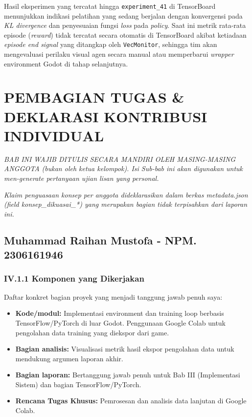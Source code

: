\documentclass[12pt,a4paper]{article}
\begin{document}
Hasil eksperimen yang tercatat hingga \texttt{experiment\_41} di TensorBoard menunjukkan indikasi pelatihan yang sedang berjalan dengan konvergensi pada \textit{KL divergence} dan penyesuaian fungsi \textit{loss} pada \textit{policy}. Saat ini metrik rata-rata episode (\textit{reward}) tidak tercatat secara otomatis di TensorBoard akibat ketiadaan \textit{episode end signal} yang ditangkap oleh \texttt{VecMonitor}, sehingga tim akan mengevaluasi perilaku visual agen secara manual atau memperbarui \textit{wrapper} environment Godot di tahap selanjutnya.

\newpage

\section{PEMBAGIAN TUGAS \& DEKLARASI KONTRIBUSI INDIVIDUAL}

\textit{BAB INI WAJIB DITULIS SECARA MANDIRI OLEH MASING-MASING ANGGOTA (bukan oleh ketua kelompok). Isi Sub-bab ini akan digunakan untuk men-generate pertanyaan ujian lisan yang personal.}

\textit{Klaim penguasaan konsep per anggota dideklarasikan dalam berkas metadata.json (field konsep\_dikuasai\_*) yang merupakan bagian tidak terpisahkan dari laporan ini.}

\subsection{Muhammad Raihan Mustofa - NPM. 2306161946}

\subsubsection*{IV.1.1 Komponen yang Dikerjakan}
Daftar konkret bagian proyek yang menjadi tanggung jawab penuh saya:
\begin{itemize}
    \item \textbf{Kode/modul:} Implementasi environment dan training loop berbasis TensorFlow/PyTorch di luar Godot. Penggunaan Google Colab untuk pengolahan data training yang diekspor dari game.
    \item \textbf{Bagian analisis:} Visualisasi metrik hasil ekspor pengolahan data untuk mendukung argumen laporan akhir.
    \item \textbf{Bagian laporan:} Bertanggung jawab penuh untuk Bab III (Implementasi Sistem) dan bagian TensorFlow/PyTorch.
    \item \textbf{Rencana Tugas Khusus:} Pemrosesan dan analisis data lanjutan di Google Colab.
\end{itemize}
\end{document}

